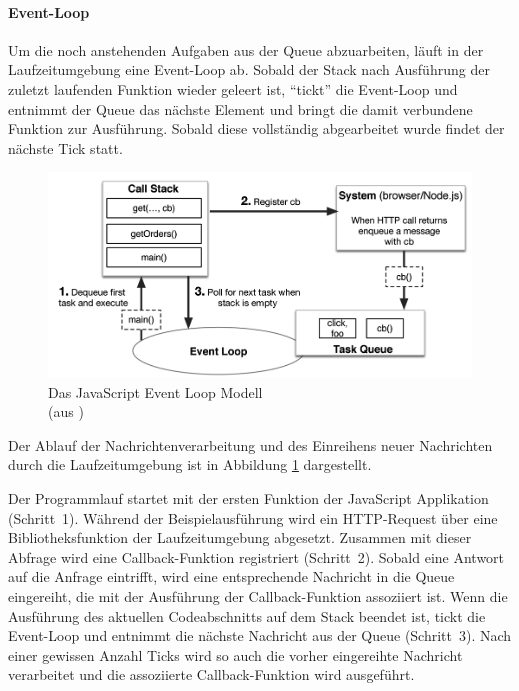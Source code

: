 \documentclass[
11pt, %
a4paper, %
oneside, %
pdfspacing, %
headinclude,
BCOR5mm, %
ngerman, %
bibtotocnumbered,
]{scrartcl}
\begin{document}
		\paragraph{Event-Loop} Um die noch anstehenden Aufgaben aus der Queue abzuarbeiten, läuft in der Laufzeitumgebung eine Event-Loop ab. Sobald der Stack nach Ausführung der zuletzt laufenden Funktion wieder geleert ist, "`tickt"' die Event-Loop und entnimmt der Queue das nächste Element und bringt die damit verbundene Funktion zur Ausführung. Sobald diese vollständig abgearbeitet wurde findet der nächste Tick statt.
		
		\begin{figure}[h]
			\centering
			\includegraphics[width=\textwidth]{Images/Gallaba,Mesbahetal.png}
			\caption[Das JavaScript Event Loop Modell]{\label{JavaScriptEventLoop}Das JavaScript Event Loop Modell\\(aus \citep[S.~2]{Gallaba.b})}
		\end{figure}
		
		Der Ablauf der Nachrichtenverarbeitung und des Einreihens neuer Nachrichten durch die Laufzeitumgebung ist in Abbildung \ref{JavaScriptEventLoop} dargestellt. 
		
		Der Programmlauf startet mit der ersten Funktion der JavaScript Applikation (Schritt~1).  
		Während der Beispielausführung wird ein HTTP-Request über eine Bibliotheksfunktion der Laufzeitumgebung abgesetzt. Zusammen mit dieser Abfrage wird eine Callback-Funktion registriert (Schritt~2).  Sobald eine Antwort auf die Anfrage eintrifft, wird eine entsprechende Nachricht in die Queue eingereiht, die mit der Ausführung der Callback-Funktion assoziiert ist. 
		Wenn die Ausführung des aktuellen Codeabschnitts auf dem Stack beendet ist, tickt die Event-Loop und entnimmt die nächste Nachricht aus der Queue (Schritt~3).  Nach einer gewissen Anzahl Ticks wird so auch die vorher eingereihte Nachricht verarbeitet und die assoziierte Callback-Funktion wird ausgeführt.
		
\end{document}
